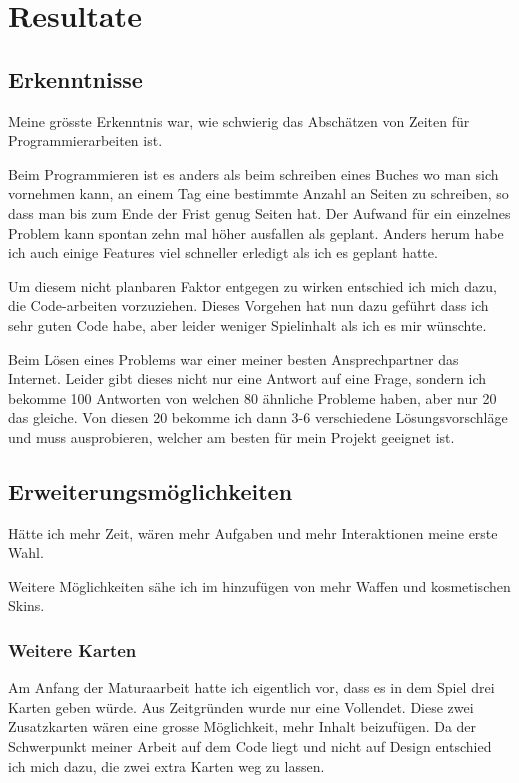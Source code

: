 \chapter{Resultate}

\section{Erkenntnisse}
Meine grösste Erkenntnis war, wie schwierig das Abschätzen von Zeiten für Programmierarbeiten ist.

Beim Programmieren ist es anders als beim schreiben eines Buches wo man sich vornehmen kann, an einem Tag eine bestimmte Anzahl an Seiten zu schreiben, so dass man bis zum Ende der Frist genug Seiten hat.
Der Aufwand für ein einzelnes Problem kann spontan zehn mal höher ausfallen als geplant. Anders herum habe ich auch einige Features viel schneller erledigt als ich es geplant hatte.

Um diesem nicht planbaren Faktor entgegen zu wirken entschied ich mich dazu, die Code-arbeiten vorzuziehen.
Dieses Vorgehen hat nun dazu geführt dass ich sehr guten Code habe, aber leider weniger Spielinhalt als ich es mir wünschte.

Beim Lösen eines Problems war einer meiner besten Ansprechpartner das Internet.
Leider gibt dieses nicht nur eine Antwort auf eine Frage, sondern ich bekomme 100 Antworten von welchen 80 ähnliche Probleme haben, aber nur 20 das gleiche.
Von diesen 20 bekomme ich dann 3-6 verschiedene Lösungsvorschläge und muss ausprobieren, welcher am besten für mein Projekt geeignet ist.




\section{Erweiterungsmöglichkeiten}
Hätte ich mehr Zeit, wären mehr Aufgaben und mehr Interaktionen meine erste Wahl.

Weitere Möglichkeiten sähe ich im hinzufügen von mehr Waffen und kosmetischen Skins.

\subsection{Weitere Karten}
Am Anfang der Maturaarbeit hatte ich eigentlich vor, dass es in dem Spiel drei Karten geben würde.
Aus Zeitgründen wurde nur eine Vollendet.
Diese zwei Zusatzkarten wären eine grosse Möglichkeit, mehr Inhalt beizufügen.
Da der Schwerpunkt meiner Arbeit auf dem Code liegt und nicht auf Design entschied ich mich dazu, die zwei extra Karten weg zu lassen.

